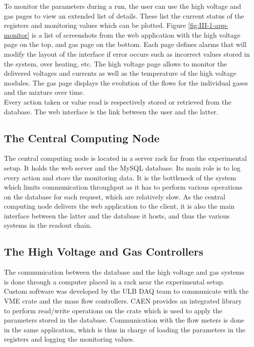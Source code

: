       To monitor the parameters during a run, the user can use the high voltage and gas pages to view an extended list of details. These list the current status of the registers and monitoring values which can be plotted. Figure \ref{fig:III-1-app-monitor} is a list of screenshots from the web application with the high voltage page on the top, and gas page on the bottom. Each page defines alarms that will modify the layout of the interface if error occurs such as incorrect values stored in the system, over heating, etc. The high voltage page allows to monitor the delivered voltages and currents as well as the temperature of the high voltage modules. The gas page displays the evolution of the flows for the individual gases and the mixture over time. \\

      Every action taken or value read is respectively stored or retrieved from the database. The web interface is the link between the user and the latter.

    \subsection{The Central Computing Node}

      The central computing node is located in a server rack far from the experimental setup. It holds the web server and the MySQL database. Its main role is to log every action and store the monitoring data. It is the bottleneck of the system which limits communication throughput as it has to perform various operations on the database for each request, which are relatively slow. As the central computing node delivers the web application to the client, it is also the main interface between the latter and the database it hosts, and thus the various systems in the readout chain.

    \subsection{The High Voltage and Gas Controllers}

      The communication between the database and the high voltage and gas systems is done through a computer placed in a rack near the experimental setup. Custom software was developed by the ULB DAQ team to communicate with the VME crate and the mass flow controllers. CAEN provides an integrated library to perform read/write operations on the crate which is used to apply the parameters stored in the database. Communication with the flow meters is done in the same application, which is thus in charge of loading the parameters in the registers and logging the monitoring values.


